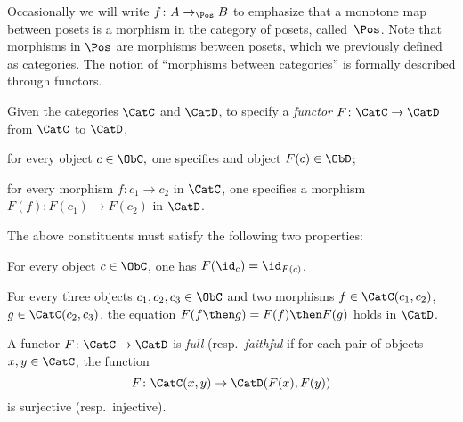 Occasionally we will write $f \colon A \to_{\Pos} B$ to emphasize that a monotone map between posets is a morphism in the category of posets, called~$\Pos$. Note that morphisms in $\Pos$ are morphisms between posets, which we previously defined as categories. The notion of ``morphisms between categories'' is formally described through functors.

\begin{shaded}
\begin{definition}[Functor]
\label{def:functor}
Given the categories $\CatC$ and $\CatD$, to specify a \emph{functor} $F\colon \CatC\to \CatD$ from $\CatC$ to $\CatD$,
\begin{compactenum}
    \item for every object $c\in \ObC,$ one specifies and object $F(c)\in \ObD$;
    \item for every morphism $f\colon c_1\to c_2$ in $\CatC$, one specifies a morphism $F(f)\colon F(c_1)\to F(c_2)$ in $\CatD$.
\end{compactenum}
The above constituents must satisfy the following two properties:
\begin{compactenum}[(a)]
    \item For every object $c\in \ObC$, one has $F(\id_c)=\id_{F(c)}$.
    \item For every three objects $c_1,c_2,c_3 \in \ObC$ and two morphisms $f\in \CatC(c_1,c_2)$, $g\in \CatC(c_2,c_3)$, the equation $F(f\then g)=F(f)\then F(g)$ holds in $\CatD$.
\end{compactenum}
\end{definition}

\begin{definition}
\label{def:functorfullfaith}
A functor $F\colon \CatC \to \CatD$ is \emph{full} (resp.\ \emph{faithful} if for each pair of objects $x,y\in \CatC$, the function
\begin{equation}
    F\colon \CatC(x,y)\to \CatD(F(x),F(y))
\end{equation}
is surjective (resp.\ injective).
\end{definition}
\end{shaded}

